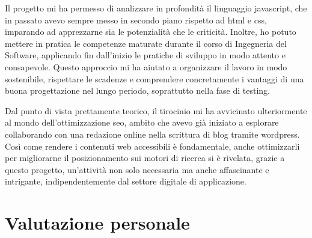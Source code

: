 \vspace{10pt}
\par\noindent Il progetto mi ha permesso di analizzare in profondità il linguaggio \gls{javascript}, che in passato avevo sempre messo in secondo piano rispetto ad \gls{html} e \gls{css}, imparando ad apprezzarne sia le potenzialità che le criticità. Inoltre, ho potuto mettere in pratica le competenze maturate durante il corso di Ingegneria del Software, applicando fin dall’inizio le pratiche di sviluppo in modo attento e consapevole. Questo approccio mi ha aiutato a organizzare il lavoro in modo sostenibile, rispettare le scadenze e comprendere concretamente i vantaggi di una buona progettazione nel lungo periodo, soprattutto nella fase di testing.

\vspace{10pt}
\par\noindent Dal punto di vista prettamente teorico, il tirocinio mi ha avvicinato ulteriormente al mondo dell’ottimizzazione \gls{seo}, ambito che avevo già iniziato a esplorare collaborando con una redazione online nella scrittura di blog tramite \gls{wordpress}. Così come rendere i contenuti web accessibili è fondamentale, anche ottimizzarli per migliorarne il posizionamento sui motori di ricerca si è rivelata, grazie a questo progetto, un’attività non solo necessaria ma anche affascinante e intrigante, indipendentemente dal settore digitale di applicazione.

\section{Valutazione personale}
